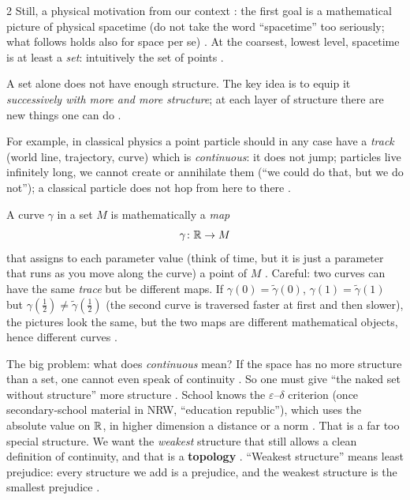 \begin{paracol}{2}
Still, a physical motivation from our context : the first goal is a mathematical picture of physical
spacetime (do not take the word ``spacetime'' too seriously; what follows holds also for space per se)
. At the coarsest, lowest level, spacetime is at least a \emph{set}: intuitively the set of
points .

\begin{definition}\label{def:tm-layers}
A set alone does not have enough structure. The key idea is to equip it \emph{successively with more and more
structure}; at each layer of structure there are new things one can do .
\end{definition}

For example, in classical physics a point particle should in any case have a \emph{track} (world line, trajectory, curve)
which is \emph{continuous}: it does not jump; particles live infinitely long, we cannot create or annihilate them
(``we could do that, but we do not''); a classical particle does not hop from here to there
.

A curve $\gamma$ in a set $M$ is mathematically a \emph{map}
\[
  \gamma\colon \mathbb{R}\to M
\]
that assigns to each parameter value (think of time, but it is just a parameter that runs as you move along the curve) a
point of $M$ . Careful: two curves can have the same \emph{trace} but be
different maps. If $\gamma(0)=\tilde\gamma(0)$, $\gamma(1)=\tilde\gamma(1)$ but $\gamma(\tfrac12)\neq\tilde\gamma(\tfrac12)$
(the second curve is traversed faster at first and then slower), the pictures look the same, but the two maps are
different mathematical objects, hence different curves .

The big problem: what does \emph{continuous} mean? If the space has no more structure than a set, one cannot even
speak of continuity . So one must give ``the naked set without structure'' more
structure . School knows the $\varepsilon$--$\delta$ criterion (once secondary-school
material in NRW, ``education republic''), which uses the absolute value on $\mathbb{R}$, in higher dimension a distance or a norm
. That is a far too special structure. We want the \emph{weakest} structure
that still allows a clean definition of continuity, and that is a \textbf{topology} .
``Weakest structure'' means least prejudice: every structure we add is a prejudice, and the weakest structure is the
smallest prejudice .


\end{paracol}
